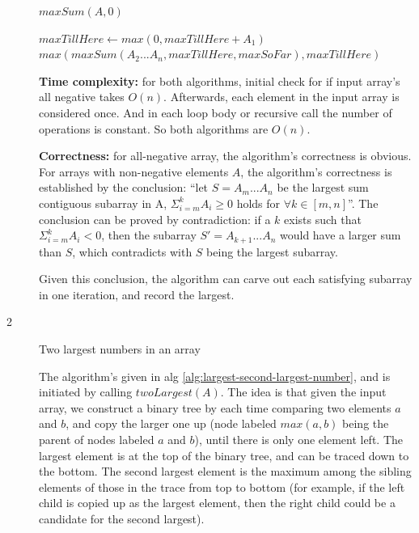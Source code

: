\documentclass{article}
\begin{document}
\begin{description}
\begin{algorithm}[H]
\begin{algorithmic}[1]
      \State $maxSum(A, 0)$
      \State {}
    \EndFunction

        \State {}
      \EndIf
      
      \State $maxTillHere \gets max(0, maxTillHere + A_1)$
      \State \Return $max(maxSum(A_2...A_n, maxTillHere, maxSoFar), maxTillHere)$
    \EndFunction
    \end{algorithmic}
  \end{algorithm}

  \textbf{Time complexity:} for both algorithms, initial check for if input array's all negative takes $O(n)$. Afterwards, each element in the input array is considered once. And in each loop body or recursive call the number of operations is constant. So both algorithms are $O(n)$.

  \textbf{Correctness:} for all-negative array, the algorithm's correctness is obvious. For arrays with non-negative elements $A$, the algorithm's correctness is established by the conclusion: ``let $S=A_m...A_n$ be the largest sum contiguous subarray in A, $\Sigma_{i=m}^{k}{A_i} \geq 0$ holds for $\forall k \in [m,n]$''. The conclusion can be proved by contradiction: if a $k$ exists such that $\Sigma_{i=m}^{k}{A_i} < 0$, then the subarray $S'=A_{k+1}...A_n$ would have a larger sum than $S$, which contradicts with $S$ being the largest subarray.

  Given this conclusion, the algorithm can carve out each satisfying subarray in one iteration, and record the largest.


\item[2]{Two largest numbers in an array}
  
  The algorithm's given in alg \ref{alg:largest-second-largest-number}, and is initiated by calling $twoLargest(A)$. The idea is that given the input array, we construct a binary tree by each time comparing two elements $a$ and $b$, and copy the larger one up (node labeled $max(a, b)$ being the parent of nodes labeled $a$ and $b$), until there is only one element left. The largest element is at the top of the binary tree, and can be traced down to the bottom. The second largest element is the maximum among the sibling elements of those in the trace from top to bottom (for example, if the left child is copied up as the largest element, then the right child could be a candidate for the second largest).


\end{description}
\end{document}

